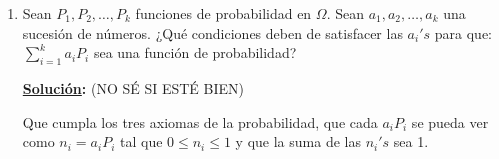 \documentclass[11pt,letterpaper]{report}
\newcommand{\sol}{\textbf{\underline{Solución}: }} %
\begin{document}
\begin{enumerate}
\sol Recordando el primer axioma de la probabilidad, donde $S$ es el espacio muestral y sea $E$ un
evento, la probabilidad del evento está acotada por $0 \geq P(E) \geq 1$. Sabiendo eso, lo
aplicaremos a la función $\mathds{Q}$.

\underline{Afirmación:} Los únicos valores que puede tomar $p$ son 0 ó 1.
\begin{proof}
    Por casos sobre $\omega$:
    \begin{itemize}
        \item $\mathds{Q}(A) = [P(A)]^2 = p^2$
        
        Si evaluamos $p$, para que satifaga el primer axioma de la probabilidad solamente podrían
        ser los valores 0, $\frac{a}{b}$ donde $a \leq b$ o un número $q$ tal que al elevarlo al
        cuadrado sea menor o igual que 1.

        \item $\mathds{Q}(B) = [P(B)]^2 = (1-p)^2$
        
        Desarrollando el binomio queda como $p^2 -2p +1$, para que $0 \leq [P(B)]^2 \leq 1$, los
        únicos valores que pueden tomar son 0 ó 1.
    \end{itemize}
    Por tanto, los únicos valores que puede tomar $p$ son 0 ó 1.
\end{proof}

\item Sean $P_1, P_2, \ldots, P_k$ funciones de probabilidad en $\Omega$. Sean
$a_1, a_2, \ldots, a_k$ una sucesión de números. ¿Qué condiciones deben de satisfacer las
$a_i's$ para que: $\sum_{i=1}^{k} a_i P_i$ sea una función de probabilidad?

\sol (NO SÉ SI ESTÉ BIEN)

Que cumpla los tres axiomas de la probabilidad, que cada $a_iP_i$ se pueda ver
como $n_i = a_iP_i$ tal que $0 \leq n_i \leq 1$ y que la suma de las $n_i's$ sea 1.


\end{enumerate}
\end{document}
